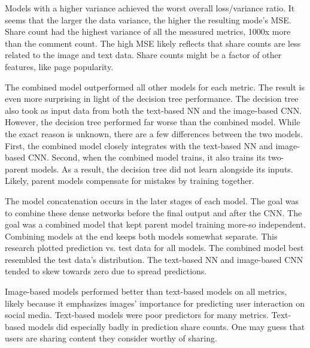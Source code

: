 \documentclass{article}
\begin{document}
Models with a higher variance achieved the worst overall loss/variance ratio.  It seems that the larger the data variance, the higher the resulting mode's MSE.  Share count had the highest variance of all the measured metrics, 1000x more than the comment count.  The high MSE likely reflects that share counts are less related to the image and text data. Share counts might be a factor of other features, like page popularity.


The combined model outperformed all other models for each metric. The result is even more surprising in light of the decision tree performance. The decision tree also took as input data from both the text-based NN and the image-based CNN. However, the decision tree performed far worse than the combined model. While the exact reason is unknown, there are a few differences between the two models. First, the combined model closely integrates with the text-based NN and image-based CNN. Second, when the combined model trains, it also trains its two-parent models. As a result, the decision tree did not learn alongside its inputs. Likely, parent models compensate for mistakes by training together.

The model concatenation occurs in the later stages of each model. The goal was to combine these dense networks before the final output and after the CNN. The goal was a combined model that kept parent model training more-so independent. Combining models at the end keeps both models somewhat separate. This research plotted prediction vs. test data for all models. The combined model best resembled the test data's distribution. The text-based NN and image-based CNN tended to skew towards zero due to spread predictions.

Image-based models performed better than text-based models on all metrics, likely because it emphasizes images' importance for predicting user interaction on social media. Text-based models were poor predictors for many metrics. Text-based models did especially badly in prediction share counts. One may guess that users are sharing content they consider worthy of sharing. 

\end{document}
